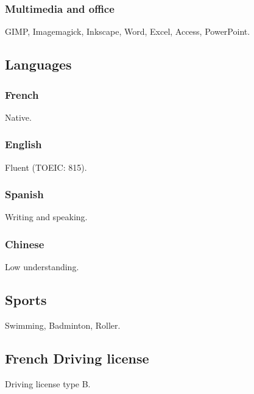 \documentclass{article}
\begin{document}
\begin{multicols}{2}
                \subsubsection{Multimedia and office}
                    GIMP, Imagemagick, Inkscape, Word, Excel, Access, PowerPoint.
            \subsection{Languages}
                \subsubsection{French}
                    Native.
                \subsubsection{English}
                    Fluent (TOEIC: 815).
                \subsubsection{Spanish}
                    Writing and speaking.
                \subsubsection{Chinese}
                    Low understanding.
                \subsection{Sports}
                    Swimming, Badminton, Roller.
                \subsection{French Driving license}
                	Driving license type B.
    \end{multicols}
\end{document}
